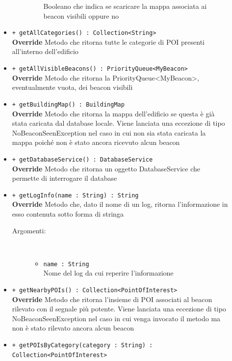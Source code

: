 \documentclass[../DefinizioneDiProdotto.tex]{subfiles}
\begin{document}
\begin{description}
\begin{itemize}
\begin{description}
\begin{itemize}
				Booleano che indica se scaricare la mappa associata ai beacon visibili oppure no	\end{itemize}
		\end{description}
		\item \texttt{+ getAllCategories() : Collection<String>}\\
		\textbf{Override} Metodo che ritorna tutte le categorie di POI presenti all'interno dell'edificio
		\item \texttt{+ getAllVisibleBeacons() : PriorityQueue<MyBeacon>}\\
		\textbf{Override} Metodo che ritorna la PriorityQueue<MyBeacon>, eventualmente vuota, dei beacon visibili
		\item \texttt{+ getBuildingMap() : BuildingMap}\\
		\textbf{Override} Metodo che ritorna la mappa dell'edificio se questa è già stata caricata dal database locale. Viene lanciata una eccezione di tipo NoBeaconSeenException nel caso in cui non sia stata caricata la mappa poiché non è stato ancora ricevuto alcun beacon
		\item \texttt{+ getDatabaseService() : DatabaseService}\\
		\textbf{Override} Metodo che ritorna un oggetto DatabaseService che permette di interrogare il database
		\item \texttt{+ getLogInfo(name : String) : String}\\
		\textbf{Override} Metodo che, dato il nome di un log, ritorna l'informazione in esso contenuta sotto forma di stringa
		\begin{description}
			\item[Argomenti:] \
			\begin{itemize}
				\item \texttt{name : String}\\
				Nome del log da cui reperire l'informazione\end{itemize}
		\end{description}
		\item \texttt{+ getNearbyPOIs() : Collection<PointOfInterest>}\\
		\textbf{Override} Metodo che ritorna l'insieme di POI associati al beacon rilevato con il segnale più potente. Viene lanciata una eccezione di tipo NoBeaconSeenException nel caso in cui venga invocato il metodo ma non è stato rilevato ancora alcun beacon
		\item \texttt{+ getPOIsByCategory(category : String) : Collection<PointOfInterest>}\\

\end{itemize}
\end{description}
\end{document}
